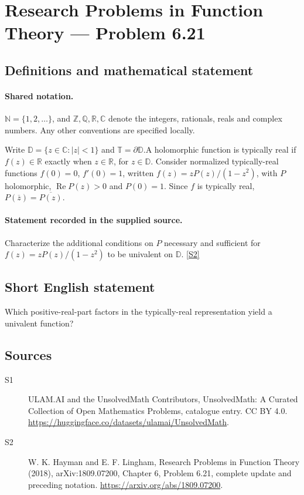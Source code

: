 \documentclass[11pt]{article}
\newcommand{\sref}[2]{\hyperlink{source:#1:#2}{[S#2]}}
\begin{document}
\section{Research Problems in Function Theory — Problem 6.21}\label{statement}

\subsection{Definitions and mathematical statement}

\paragraph{Shared notation.}$\mathbb N=\{1,2,\ldots\}$, and $\mathbb Z,\mathbb Q,\mathbb R,\mathbb C$ denote the integers, rationals, reals and complex numbers. Any other conventions are specified locally.


Write $\mathbb D=\{z\in\mathbb C:|z|<1\}$ and $\mathbb T=\partial\mathbb D$.A holomorphic function is typically real if $f(z)\in\mathbb R$ exactly when $z\in\mathbb R$, for $z\in\mathbb D$. Consider normalized typically-real functions $f(0)=0$, $f'(0)=1$, written $f(z)=zP(z)/(1-z^2)$, with $P$ holomorphic, $\operatorname{Re}P(z)>0$ and $P(0)=1$. Since $f$ is typically real, $P(\overline z)=\overline{P(z)}$.
\paragraph{Statement recorded in the supplied source.}
Characterize the additional conditions on $P$ necessary and sufficient for $f(z)=zP(z)/(1-z^2)$ to be univalent on $\mathbb D$. \sref{statement}{2}
\subsection{Short English statement}
Which positive-real-part factors in the typically-real representation yield a univalent function?
\subsection{Sources}
\begin{description}
\item[\hypertarget{source:statement:1}{S1}] ULAM.AI and the UnsolvedMath Contributors, UnsolvedMath: A Curated Collection of Open Mathematics Problems, catalogue entry. CC BY 4.0. \url{https://huggingface.co/datasets/ulamai/UnsolvedMath}.
\item[\hypertarget{source:statement:2}{S2}] W. K. Hayman and E. F. Lingham, Research Problems in Function Theory (2018), arXiv:1809.07200, Chapter 6, Problem 6.21, complete update and preceding notation. \url{https://arxiv.org/abs/1809.07200}.
\end{description}
\label{end:statement}
\end{document}
